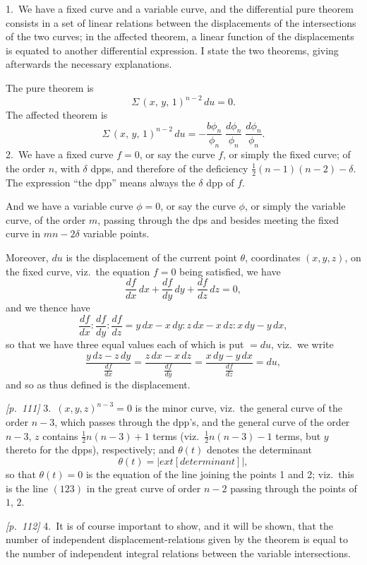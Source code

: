\documentclass[11pt,a4paper]{article}
\theoremstyle{plain}
\theoremstyle{definition}
\theoremstyle{remark}
\begin{document}
1.\ We have a fixed curve and a variable curve, and the differential pure theorem consists in a set of linear relations between the displacements of the intersections of the two curves; in the affected theorem, a linear function of the displacements is equated to another differential expression. I state the two theorems, giving afterwards the necessary explanations.

The pure theorem is
\[
\Sigma\,(x,\,y,\,1)^{n-2}\,du = 0.
\]
The affected theorem is
\[
\Sigma\,(x,\,y,\,1)^{n-2}\,du = -\frac{b\phi_n}{\phi_n}\;\frac{d\phi_n}{\phi_n}\;\frac{d\phi_n}{\phi_n}.
\]
2.\ We have a fixed curve $f = 0$, or say the curve $f$, or simply the fixed curve; of the order $n$, with $\delta$ dpps, and therefore of the deficiency $\frac{1}{2}(n - 1)(n - 2) - \delta$. The expression ``the dpp'' means always the $\delta$ dpp of $f$.

And we have a variable curve $\phi = 0$, or say the curve $\phi$, or simply the variable curve, of the order $m$, passing through the dps and besides meeting the fixed curve in $mn - 2\delta$ variable points.

Moreover, $du$ is the displacement of the current point $\theta$, coordinates $(x, y, z)$, on the fixed curve, viz.\ the equation $f = 0$ being satisfied, we have
\[
\frac{df}{dx}\,dx + \frac{df}{dy}\,dy + \frac{df}{dz}\,dz = 0,
\]
and we thence have
\[
\frac{df}{dx} : \frac{df}{dy} : \frac{df}{dz} = y \,dx - x \,dy : z \,dx - x \,dz : x \,dy - y \,dx,
\]
so that we have three equal values each of which is put $= du$, viz.\ we write
\[
\frac{y \,dz - z \,dy}{\frac{df}{dx}} = \frac{z \,dx - x \,dz}{\frac{df}{dy}} = \frac{x \,dy - y \,dx}{\frac{df}{dz}} = du,
\]
and so as thus defined is the displacement.

\noindent\textit{[p.~111]} 3.\ $(x, y, z)^{n - 3} = 0$ is the minor curve, viz.\ the general curve of the order $n - 3$, which passes through the dpp's, and the general curve of the order $n - 3$, $z$ contains $\frac{1}{2}n(n - 3) + 1$ terms (viz.\ $\frac{1}{2}n(n - 3) - 1$ terms, but $y$ thereto for the dpps), respectively; and $\theta(t)$ denotes the determinant
\[
\theta(t) =
\left|
	ext{[determinant]}
\right|,
\]
so that $\theta(t) = 0$ is the equation of the line joining the points 1 and 2; viz.\ this is the line $(123)$ in the great curve of order $n - 2$ passing through the points of $1$, $2$.

\bigskip\noindent\textit{[p.~112]} 4.\ It is of course important to show, and it will be shown, that the number of independent displacement-relations given by the theorem is equal to the number of independent integral relations between the variable intersections.
\end{document}
